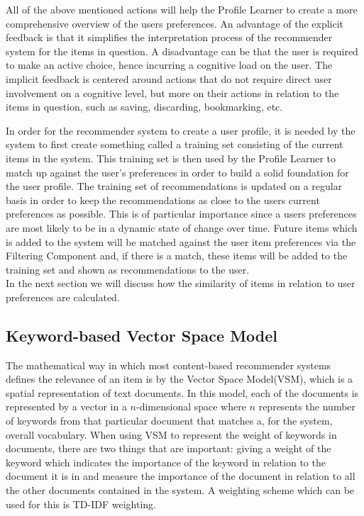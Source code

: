 All of the above mentioned actions will help the Profile Learner to create a more comprehensive overview of the users preferences. An advantage of the explicit feedback is that it simplifies the interpretation process of the recommender system for the items in question. A disadvantage can be that the user is required to make an active choice, hence incurring a cognitive load on the user. The implicit feedback is centered around actions that do not require direct user involvement on a cognitive level, but more on their actions in relation to the items in question, such as saving, discarding, bookmarking, etc.\newline

In order for the recommender system to create a user profile, it is needed by the system to first create something called a training set consisting of the current items in the system. This training set is then used by the Profile Learner to match up against the user's preferences in order to build a solid foundation for the user profile. The training set of recommendations is updated on a regular basis in order to keep the recommendations as close to the users current preferences as possible. This is of particular importance since a users preferences are most likely to be in a dynamic state of change over time. Future items which is added to the system will be matched against the user item preferences via the Filtering Component and, if there is a match, these items will be added to the training set and shown as recommendations to the user. \\
In the next section we will discuss how the similarity of items in relation to user preferences are calculated.

\subsection{Keyword-based Vector Space Model}
The mathematical way in which most content-based recommender systems defines the relevance of an item is by the Vector Space Model(VSM), which is a spatial representation of text documents. In this model, each of the documents is represented by a vector in a \(n\)-dimensional space where \(n\) represents the number of keywords from that particular document that matches a, for the system, overall vocabulary.\newline
When using VSM to represent the weight of keywords in documents, there are two things that are important: giving a weight of the keyword which indicates the importance of the keyword in relation to the document it is in and measure the importance of the document in relation to all the other documents contained in the system. A weighting scheme which can be used for this is TD-IDF weighting. \newline

